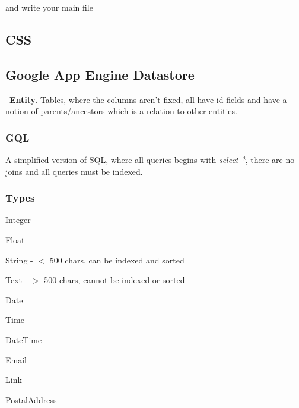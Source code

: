 \documentclass[12pt]{article}
\begin{document}


and write your main file





\subsection{CSS}





\subsection{Google App Engine Datastore}
\
\textbf{Entity.} Tables, where the columns aren't fixed, all have id fields and have a notion of parents/ancestors which is a relation to other entities.


\subsubsection{GQL}

A simplified version of SQL, where all queries begins with \emph{select *}, there are no joins and all queries must be indexed.




\subsubsection{Types}

\begin{list}{*}{
\setlength{\itemsep}{0pt}
\setlength{\parsep}{0pt}
\setlength{\topsep}{0pt}
\setlength{\partopsep}{0pt}
\setlength{\leftmargin}{2em}
\setlength{\labelwidth}{1.5em}
\setlength{\labelsep}{0.5em}
}
\item Integer
\item Float
\item String - $<$ 500 chars, can be indexed and sorted
\item Text - $>$ 500 chars, cannot be indexed or sorted
\item Date
\item Time
\item DateTime
\item Email
\item Link
\item PostalAddress
\end{list}
\end{document}
